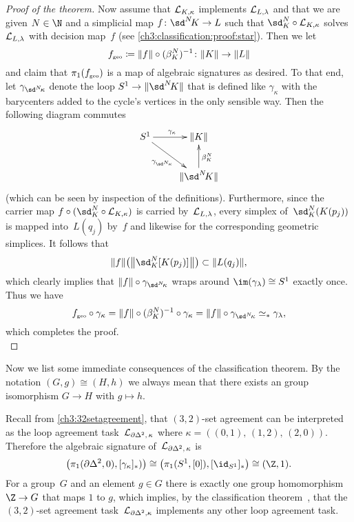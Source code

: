 \begin{proof}[Proof of the theorem]
\pagebreak[2]
    Now assume that $\mathcal{L}_{K,\kappa}$ implements $\mathcal{L}_{L,\lambda}$ and that we
    are given $N\in\N$ and a simplicial map $f\colon\sdNK\to L$ such that
    $\sd_K^N\after\Loop{K,\kappa}$ solves $\mathcal{L}_{L,\lambda}$ with decision
    map~$f$ (see \eqref{ch3:classification:proof:star}). Then we let
    \[ f_\geo \defeq \geom{f} \after (\beta_K^N)^{-1}
        \colon\geom K\to\geom L
    \]
    and claim that $\pi_1(f_{\scriptscriptstyle\mathrm{geo}})$ is a map of algebraic signatures as desired.
    To that end, let $\gamma_{\sdNkappa}$ denote the loop
    $S^1\to\geom{\sdNK}$ that is defined like $\gamma_\kappa$
     with the barycenters added to the cycle's
    vertices in the only sensible way. Then the following diagram commutes
    \[
        \xymatrix{
            S^1 \ar[r]^{\gamma_\kappa} \ar[dr]_{\gamma_{\sdNkappa}}
            & \geom{K}
            \\
            & \geom{\sdNK} \ar[u]_{\beta_K^N}
        }
    \]
    (which can be seen by inspection of the definitions).
    Furthermore, since the carrier map
    $f\after(\sd_K^N\after\Loop{K,\kappa})$ is
    carried by~$\mathcal{L}_{L,\lambda}$, every simplex of~$\sd_K^N(K(p_j))$
    is mapped into~$L(q_j)$ by~$f$ and likewise for the corresponding
    geometric simplices. It follows that
    \[ \geom{f}\bigl(\geom[\big]{\sd_K^N[K(p_j)]\mkern1mu}\bigr)
        \subset \geom{L(q_j)}
    , \]
    which clearly implies that $\geom{f}\after\gamma_{\sdNkappa}$
    wraps around $\im(\gamma_\lambda)\cong S^1$ exactly once.
    Thus we have
    \[ f_\geo\after\gamma_\kappa 
        = \geom{f}\after(\beta_K^N)^{-1} \after\gamma_\kappa
        = \geom{f}\after\gamma_{\sdNkappa}
        \simeq_\ast \gamma_\lambda
    , \]
    which completes the proof.
    \\
\end{proof}

\pagebreak[2]
Now we list some immediate consequences of the classification theorem.
By the notation $(G,g) \cong (H,h)$ we always mean that there exists an group
isomorphism $G\to H$ with $g\mapsto h$.

\begin{thCorollary}
    \label{ch3:32setagreementisboss}
    Recall from \cref{ch3:32setagreement}, that $(3,2)$-set agreement can be
    interpreted as the loop agreement task~$\mathcal{L}_{\partial\Delta^2,\,\kappa}$
    where $\kappa = ((0,1),\,(1,2),\,(2,0))$. Therefore the algebraic signature
    of~$\mathcal{L}_{\partial\Delta^2,\,\kappa}$ is
    \[ \bigl( \pi_1(\partial\Delta^2,0), [\gamma_\kappa]_\ast) \bigr)
        \cong \bigl( \pi_1(S^1,[0]), [\id_{S^1}]_\ast \bigr)
        \cong (\Z,1)
    . \]
    For a group~$G$ and an element $g\in G$ there is exactly one group
    homomorphism $\Z\to G$ that maps $1$ to $g$, which implies, by the
    classification theorem~, that the $(3,2)$-set
    agreement task~$\mathcal{L}_{\partial\Delta^2,\kappa}$ implements any other
    loop agreement task.
\end{thCorollary}

